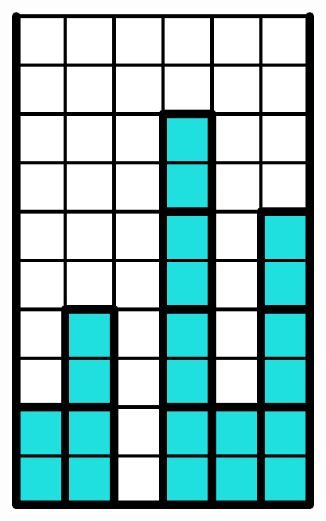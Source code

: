 \begin{figure}[ht]
  \centering
  \begin{subfigure}[b]{0.2\textwidth}
    \centering
    \includegraphics[width=0.9\textwidth]{pictures/dominoes/vertical_configuration.pdf}
    \caption{}
  \end{subfigure}
  \begin{subfigure}[b]{0.2\textwidth}
    \centering

\end{subfigure}
\end{figure}
